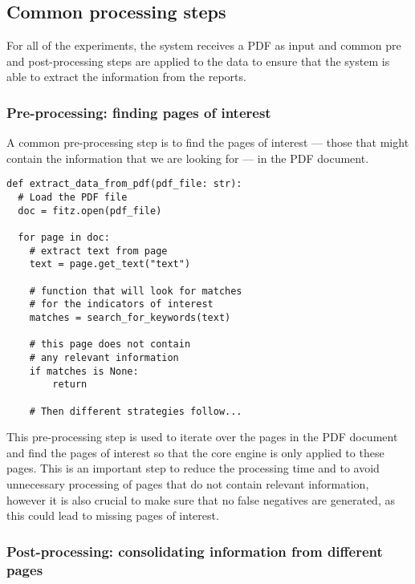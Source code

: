 \documentclass[english, 12pt, a4paper, elec, utf8, a-2b, online]{aaltothesis}
\begin{document}
\subsection{Common processing steps}

For all of the experiments, the system receives a \ac{PDF} as input and common pre and post-processing steps are applied to the data to ensure that the system is able to extract the information from the reports.

\subsubsection{Pre-processing: finding pages of interest}

A common pre-processing step is to find the pages of interest --- those that might contain the information that we are looking for --- in the \ac{PDF} document.

\begin{verbatim}
def extract_data_from_pdf(pdf_file: str):
  # Load the PDF file
  doc = fitz.open(pdf_file)

  for page in doc:
    # extract text from page
    text = page.get_text("text")

    # function that will look for matches
    # for the indicators of interest
    matches = search_for_keywords(text)

    # this page does not contain
    # any relevant information
    if matches is None:
        return

    # Then different strategies follow...
\end{verbatim}

This pre-processing step is used to iterate over the pages in the \ac{PDF} document and find the pages of interest so that the core engine is only applied to these pages.
This is an important step to reduce the processing time and to avoid unnecessary processing of pages that do not contain relevant information, however it is also crucial to make sure that no false negatives are generated, as this could lead to missing pages of interest.

\subsubsection{Post-processing: consolidating information from different pages}
\end{document}
